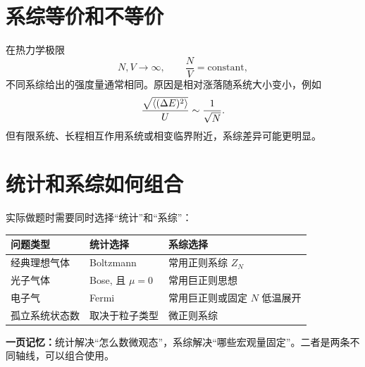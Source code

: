 \section{系综等价和不等价}

在热力学极限
\[
  N,V\to\infty,\qquad \frac{N}{V}=\text{constant},
\]
不同系综给出的强度量通常相同。原因是相对涨落随系统大小变小，例如
\[
  \frac{\sqrt{\left\langle (\Delta E)^2 \right\rangle}}{U}
  \sim
  \frac{1}{\sqrt{N}}.
\]
但有限系统、长程相互作用系统或相变临界附近，系综差异可能更明显。

\section{统计和系综如何组合}

实际做题时需要同时选择“统计”和“系综”：
\begin{center}
\small
\begin{tabular}{p{} p{} p{}}
\toprule
问题类型 & 统计选择 & 系综选择 \\
\midrule
经典理想气体 & Boltzmann & 常用正则系综 $Z_N$ \\
光子气体 & Bose, 且 $\mu=0$ & 常用巨正则思想 \\
电子气 & Fermi & 常用巨正则或固定 $N$ 低温展开 \\
孤立系统状态数 & 取决于粒子类型 & 微正则系综 \\
\bottomrule
\end{tabular}
\end{center}

\begin{keybox}
\textbf{一页记忆：}统计解决“怎么数微观态”，系综解决“哪些宏观量固定”。二者是两条不同轴线，可以组合使用。
\end{keybox}
